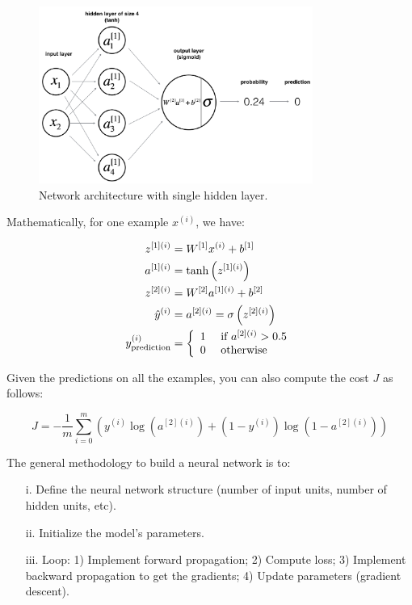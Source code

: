\begin{figure}[!htbp]
    \centering 
    \includegraphics[width=0.8\textwidth, trim={0 0 0 0}, clip]{img/c1/classification_kiank.png}
    \caption{Network architecture with single hidden layer.}
    \label{classification-kiank}
\end{figure}

Mathematically, for one example $x^(i)$, we have: 

\begin{equation}
\centering
\begin{aligned}
z^{[1](i)}&=W^{[1]} x^{(i)}+b^{[1]} \\
a^{[1](i)}&=\tanh \left(z^{[1](i)}\right) \\
z^{[2](i)}&=W^{[2]} a^{[1](i)}+b^{[2]} \\
\hat{y}^{(i)}&=a^{[2](i)}=\sigma\left(z^{[2](i)}\right) \\
y^{(i)}_{\text {prediction}}&=\left\{\begin{array}{ll}
1 & \text { if } a^{[2](i)}>0.5 \\
0 & \text { otherwise }
\end{array}\right.
\end{aligned}
\end{equation}

Given the predictions on all the examples, you can also compute the cost $J$ as follows:

\begin{equation}
    J=-\frac{1}{m} \sum_{i=0}^{m}\left(y^{(i)} \log \left(a^{[2](i)}\right)+\left(1-y^{(i)}\right) \log \left(1-a^{[2](i)}\right)\right)
\end{equation}

The general methodology to build a neural network is to:

\begin{itemize}
    \item[i.]  Define the neural network structure (number of input units, number of hidden units, etc).
    \item[ii.] Initialize the model's parameters.
    \item[iii.] Loop: 1) Implement forward propagation; 2) Compute loss; 3) Implement backward propagation to get the gradients; 4) Update parameters (gradient descent).
\end{itemize}

